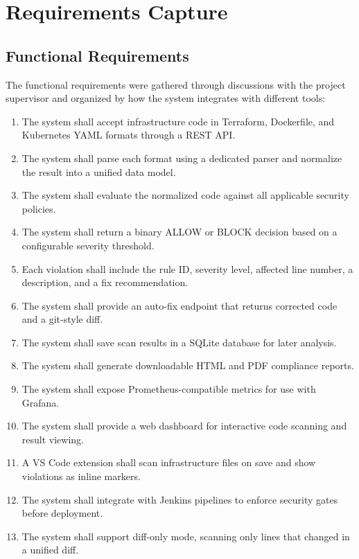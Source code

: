 \section{Requirements Capture}
\label{sec:requirements}

\subsection{Functional Requirements}

The functional requirements were gathered through discussions with the project supervisor and organized by how the system integrates with different tools:

\begin{enumerate}[leftmargin=2cm, label=\textbf{FR-\arabic*}, labelsep=0.5cm]
  \item The system shall accept infrastructure code in Terraform, Dockerfile, and Kubernetes YAML formats through a REST API.
  \item The system shall parse each format using a dedicated parser and normalize the result into a unified data model.
  \item The system shall evaluate the normalized code against all applicable security policies.
  \item The system shall return a binary ALLOW or BLOCK decision based on a configurable severity threshold.
  \item Each violation shall include the rule ID, severity level, affected line number, a description, and a fix recommendation.
  \item The system shall provide an auto-fix endpoint that returns corrected code and a git-style diff.
  \item The system shall save scan results in a SQLite database for later analysis.
  \item The system shall generate downloadable HTML and PDF compliance reports.
  \item The system shall expose Prometheus-compatible metrics for use with Grafana.
  \item The system shall provide a web dashboard for interactive code scanning and result viewing.
  \item A VS Code extension shall scan infrastructure files on save and show violations as inline markers.
  \item The system shall integrate with Jenkins pipelines to enforce security gates before deployment.
  \item The system shall support diff-only mode, scanning only lines that changed in a unified diff.
\end{enumerate}

